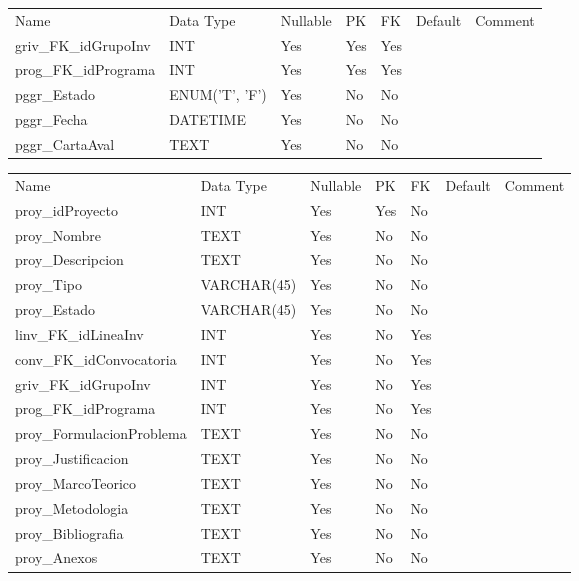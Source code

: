 			\begin{center}
				\begin{tabular}{ |l|l|l|l|l|l|l| }
					\hline
					Name & Data Type & Nullable & PK & FK & Default & Comment \\
					griv_FK_idGrupoInv & INT & Yes & Yes & Yes &  & \\ \hline 
prog_FK_idPrograma & INT & Yes & Yes & Yes &  & \\ \hline 
pggr_Estado & ENUM('T', 'F') & Yes & No & No &  & \\ \hline 
pggr_Fecha & DATETIME & Yes & No & No &  & \\ \hline 
pggr_CartaAval & TEXT & Yes & No & No &  & \\ \hline 

				\end{tabular}
			\end{center}
		

			\begin{center}
				\begin{tabular}{ |l|l|l|l|l|l|l| }
					\hline
					Name & Data Type & Nullable & PK & FK & Default & Comment \\
					proy_idProyecto & INT & Yes & Yes & No &  & \\ \hline 
proy_Nombre & TEXT & Yes & No & No &  & \\ \hline 
proy_Descripcion & TEXT & Yes & No & No &  & \\ \hline 
proy_Tipo & VARCHAR(45) & Yes & No & No &  & \\ \hline 
proy_Estado & VARCHAR(45) & Yes & No & No &  & \\ \hline 
linv_FK_idLineaInv & INT & Yes & No & Yes &  & \\ \hline 
conv_FK_idConvocatoria & INT & Yes & No & Yes &  & \\ \hline 
griv_FK_idGrupoInv & INT & Yes & No & Yes &  & \\ \hline 
prog_FK_idPrograma & INT & Yes & No & Yes &  & \\ \hline 
proy_FormulacionProblema & TEXT & Yes & No & No &  & \\ \hline 
proy_Justificacion & TEXT & Yes & No & No &  & \\ \hline 
proy_MarcoTeorico & TEXT & Yes & No & No &  & \\ \hline 
proy_Metodologia & TEXT & Yes & No & No &  & \\ \hline 
proy_Bibliografia & TEXT & Yes & No & No &  & \\ \hline 
proy_Anexos & TEXT & Yes & No & No &  & \\ \hline 

				\end{tabular}
			\end{center}
		

